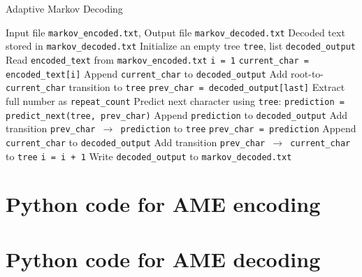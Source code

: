 \documentclass[12pt,twoside]{article}
\begin{document}
\begin{appendices}
\begin{algorithm}
    \caption{Adaptive Markov Decoding}
    \label{alg:markov_decode}
    \begin{algorithmic}[1]
    \REQUIRE Input file \texttt{markov\_encoded.txt}, Output file \texttt{markov\_decoded.txt}
    \ENSURE Decoded text stored in \texttt{markov\_decoded.txt}
    \STATE Initialize an empty tree \texttt{tree}, list \texttt{decoded\_output}
    \STATE Read \texttt{encoded\_text} from \texttt{markov\_encoded.txt}
    \STATE \texttt{i = 1}
        \STATE \texttt{current\_char = encoded\_text[i]}
            \STATE Append \texttt{current\_char} to \texttt{decoded\_output}
            \STATE Add root-to-\texttt{current\_char} transition to \texttt{tree}
        \ELSE
            \STATE \texttt{prev\_char = decoded\_output[last]}
                \STATE Extract full number as \texttt{repeat\_count}
                \STATE Predict next character using \texttt{tree}: \texttt{prediction = predict\_next(tree, prev\_char)}
                    \STATE Append \texttt{prediction} to \texttt{decoded\_output}
                    \STATE Add transition \texttt{prev\_char $\to$ prediction} to \texttt{tree}
                    \STATE \texttt{prev\_char = prediction}
                \ENDFOR
            \ELSE
                \STATE Append \texttt{current\_char} to \texttt{decoded\_output}
                \STATE Add transition \texttt{prev\_char $\to$ current\_char} to \texttt{tree}
            \ENDIF
        \ENDIF
        \STATE \texttt{i = i + 1}
    \ENDWHILE
    \STATE Write \texttt{decoded\_output} to \texttt{markov\_decoded.txt}
    \end{algorithmic}
\end{algorithm}

\newpage
\section{Python code for AME encoding}
\label{app:markov_encode}


\newpage
\section{Python code for AME decoding}
\label{app:markov_decode}


\end{appendices}
\end{document}
